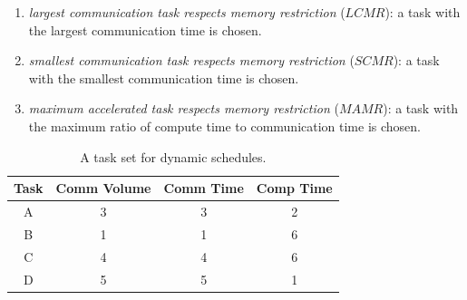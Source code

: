 \documentclass[sigconf]{acmart}
\begin{document}
	\begin{enumerate}[label=\roman*)]
		
		\item \textit{largest communication task respects memory restriction} ($LCMR$): a task with the largest communication time is chosen. 
		\item \textit{smallest communication task respects memory restriction} ($SCMR$): a task with the smallest communication time is chosen.
		\item \textit{maximum accelerated task respects memory restriction} ($MAMR$): a task with the maximum ratio of compute time to communication time is chosen.
	\end{enumerate}
	\begin{table}[htb]
		\begin{center}
			
			\begin{tabular}{|c|c|c|c|}
				\hline
				Task & Comm Volume & Comm Time & Comp Time\\ \hline 
				A & 3 & 3 & 2\\ \hline
				B & 1 & 1 &  6\\ \hline
				C & 4 & 4 & 6\\ \hline
				D & 5 & 5 & 1\\ \hline
			\end{tabular}
			\caption{\label{tab:dynamicSelectionExample} A task set for dynamic schedules.}
		\end{center}
	\end{table}
	
\end{document}
